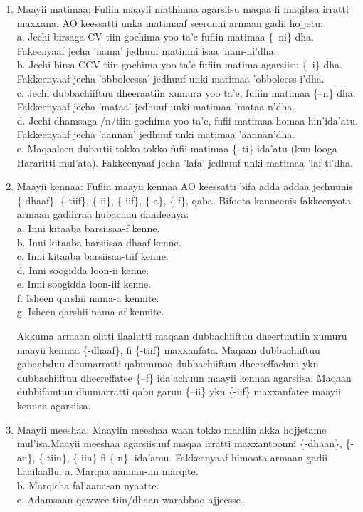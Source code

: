 \documentclass[11pt,b5paper]{book}
\begin{document}
\begin{enumerate}
	\item {Maayii matimaa}: Fufiin maayii mathimaa agarsiisu maqaa fi maqibsa irratti maxxana. AO keessatti unka matimaaf seeronni armaan gadii hojjetu\cite{griefenow2001grammatical}: \\
a. Jechi birsaga CV tiin gochima yoo ta’e fufiin matimaa \{–ni\} dha. Fakeenyaaf jecha 'nama' jedhuuf matimni isaa 'nam-ni'dha.\\
b. Jechi birsa CCV tiin gochima yoo ta’e fufiin matima agarsiisu \{–i\} dha. Fakkeenyaaf jecha 'obboleessa' jedhuuf unki matimaa 'obboleess-i'dha.\\
c. Jechi dubbachiiftuu dheeraatiin xumura yoo ta’e, fufiin matimaa \{–n\} dha. Fakkeenyaaf jecha 'mataa' jedhuuf unki matimaa 'mataa-n'dha.\\
d. Jechi dhamsaga /n/tiin gochima yoo ta’e, fufii matimaa homaa hin’ida’atu. Fakkeenyaaf jecha 'aannan' jedhuuf unki matimaa 'aannan'dha.\\
e. Maqaaleen dubartii tokko tokko fufii matimaa \{–ti\} ida’atu (kun looga Hararitti mul’ata). Fakkeenyaaf jecha 'lafa' jedhuuf unki matimaa 'laf-ti'dha.

	\item{Maayii kennaa}:  Fufiin maayii kennaa AO keessatti bifa adda addaa jechuunis \{-dhaaf\}, \{-tiif\}, \{-ii\}, \{-iif\}, \{-a\}, \{-f\}, qaba. Bifoota kanneenis
fakkeenyota armaan gadiirraa hubachuu dandeenya:\\
a. Inni kitaaba barsiisaa-f kenne.\\
b. Inni kitaaba barsiisaa-dhaaf kenne.\\
c. Inni kitaaba barsiisaa-tiif kenne.\\
d. Inni soogidda loon-ii kenne.\\
e. Inni soogidda loon-iif kenne.\\
f. Isheen qarshii nama-a kennite.\\
g. Isheen qarshii nama-af kennite.

Akkuma armaan olitti ilaalutti maqaan dubbachiiftuu dheertuutiin xumuru maayii kennaa \{-dhaaf\}, fi \{-tiif\} maxxanfata. Maqaan dubbachiiftuu gabaabduu dhumarratti qabummoo dubbachiiftuu dheereffachuu ykn dubbachiiftuu dheereffatee \{–f\} ida'achuun maayii kennaa agarsiisa. Maqaan dubbifamtuu dhumarratti qabu garuu \{–ii\} ykn \{-iif\} maxxanfatee maayii kennaa agarsiisa. 

	\item{Maayii meeshaa}: Maayiin meeshaa waan tokko maaliin akka hojjetame mul'isa.Maayii meeshaa agarsiisuuf maqaa irratti maxxantoonni \{-dhaan\}, \{-an\}, \{-tiin\}, \{-iin\} fi \{-n\}, ida'amu. Fakkeenyaaf himoota armaan gadii haailaallu:
a. Marqaa aannan-iin marqite.\\
b. Marqicha fal’aana-an nyaatte.\\
c. Adamsaan qawwee-tiin/dhaan warabboo ajjeesse.


\end{enumerate}
\end{document}
